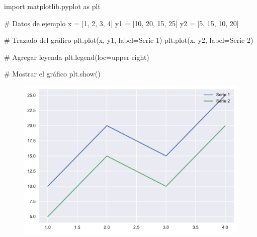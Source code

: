 \documentclass[
  a4paper,
]{article}
\newenvironment{Shaded}{}{}
\newcommand{\CommentTok}[1]{\textcolor[rgb]{0.42,0.45,0.49}{#1}}
\newcommand{\DecValTok}[1]{\textcolor[rgb]{0.00,0.36,0.77}{#1}}
\newcommand{\ImportTok}[1]{\textcolor[rgb]{0.01,0.18,0.38}{#1}}
\newcommand{\NormalTok}[1]{\textcolor[rgb]{0.14,0.16,0.18}{#1}}
\newcommand{\OperatorTok}[1]{\textcolor[rgb]{0.14,0.16,0.18}{#1}}
\newcommand{\StringTok}[1]{\textcolor[rgb]{0.01,0.18,0.38}{#1}}
\begin{document}
\begin{Shaded}
\begin{Highlighting}[]
\ImportTok{import}\NormalTok{ matplotlib.pyplot }\ImportTok{as}\NormalTok{ plt}

\CommentTok{\# Datos de ejemplo}
\NormalTok{x }\OperatorTok{=}\NormalTok{ [}\DecValTok{1}\NormalTok{, }\DecValTok{2}\NormalTok{, }\DecValTok{3}\NormalTok{, }\DecValTok{4}\NormalTok{]}
\NormalTok{y1 }\OperatorTok{=}\NormalTok{ [}\DecValTok{10}\NormalTok{, }\DecValTok{20}\NormalTok{, }\DecValTok{15}\NormalTok{, }\DecValTok{25}\NormalTok{]}
\NormalTok{y2 }\OperatorTok{=}\NormalTok{ [}\DecValTok{5}\NormalTok{, }\DecValTok{15}\NormalTok{, }\DecValTok{10}\NormalTok{, }\DecValTok{20}\NormalTok{]}

\CommentTok{\# Trazado del gráfico}
\NormalTok{plt.plot(x, y1, label}\OperatorTok{=}\StringTok{\textquotesingle{}Serie 1\textquotesingle{}}\NormalTok{)}
\NormalTok{plt.plot(x, y2, label}\OperatorTok{=}\StringTok{\textquotesingle{}Serie 2\textquotesingle{}}\NormalTok{)}

\CommentTok{\# Agregar leyenda}
\NormalTok{plt.legend(loc}\OperatorTok{=}\StringTok{\textquotesingle{}upper right\textquotesingle{}}\NormalTok{)}

\CommentTok{\# Mostrar el gráfico}
\NormalTok{plt.show()}
\end{Highlighting}
\end{Shaded}

\begin{figure}[H]

{\centering \includegraphics{index_files/figure-pdf/cell-12-output-1.pdf}

}

\end{figure}
\end{document}
